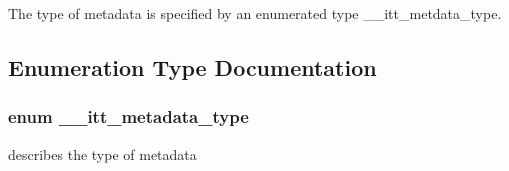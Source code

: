 The type of metadata is specified by an enumerated type \+\_\+\+\_\+itt\+\_\+metdata\+\_\+type. 

\subsection{Enumeration Type Documentation}
\hypertarget{group__metadata_ga906320efadd24c37fc2ee021e880a673}{}
\subsubsection[{\+\_\+\+\_\+itt\+\_\+metadata\+\_\+type}]{\setlength{\rightskip}{0pt plus 5cm}enum {\bf \+\_\+\+\_\+itt\+\_\+metadata\+\_\+type}}\label{group__metadata_ga906320efadd24c37fc2ee021e880a673}


describes the type of metadata 

